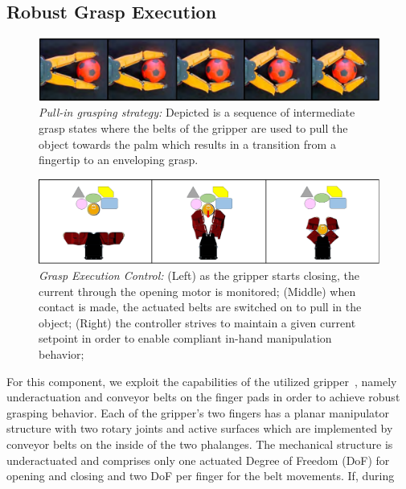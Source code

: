 \subsection{Robust Grasp Execution}
\label{subsec:grasp_execution}
%
\begin{figure}[!t]
 \centering
   \includegraphics[width = 1\linewidth]{figs/pull_in}
   \caption{\textit{Pull-in grasping strategy:} Depicted is a sequence of intermediate grasp states
     where the belts of the gripper are used to pull the object towards the palm which results in a
     transition from a fingertip to an enveloping grasp.}
   \vspace{-4mm}
   \label{fig:pull_in}
   \centering
 \end{figure}
 \begin{figure}[!t]
   \centering
 \includegraphics[width = 1\linewidth]{figs/vcg}
   \caption{\textit{Grasp Execution Control:} (Left) as the gripper starts closing, the current
     through the opening motor is monitored; (Middle) when contact is made, the actuated belts are
     switched on to pull in the object; (Right) the controller strives to maintain a given current
     setpoint in order to enable compliant in-hand manipulation behavior;}
   \label{fig:pull_in_control}
   \centering
   \vspace{-0.62cm}
 \end{figure}
%
 For this component, we exploit the capabilities of the utilized gripper~\cite{Tinc12}, namely
 underactuation and conveyor belts on the finger pads in order to achieve robust grasping
 behavior. Each of the gripper’s two fingers has a planar manipulator structure with two rotary
 joints and active surfaces which are implemented by conveyor belts on the inside of the two
 phalanges. The mechanical structure is underactuated and comprises only one actuated Degree of
 Freedom (DoF) for opening and closing and two DoF per finger for the belt movements. If, during
